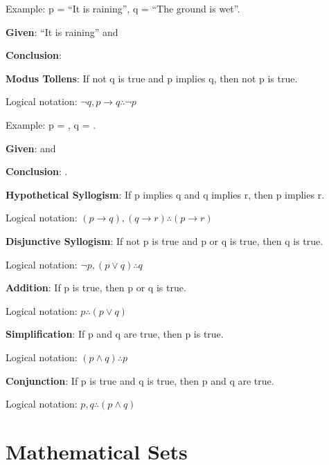 Example: p = ``It is raining'', q = ``The ground is wet''.

\textbf{Given}: ``It is raining'' and 

\textbf{Conclusion}: 

\vspace{4 mm}

\textbf{Modus Tollens}: If not q is true and p implies q, then not p is true.

Logical notation: \(\neg q, p \rightarrow q \therefore \neg p\)

Example: p = , q = .

\textbf{Given}:  and 

\textbf{Conclusion}: .

\vspace{10 mm}

\textbf{Hypothetical Syllogism}: If p implies q and q implies r, then p implies r.

Logical notation: \((p \rightarrow q), (q \rightarrow r) \therefore (p \rightarrow r)\)

\vspace{4 mm}

\textbf{Disjunctive Syllogism}: If not p is true and p or q is true, then q is true.

Logical notation: \(\neg p, (p \vee q) \therefore q\)

\vspace{10 mm}

\textbf{Addition}: If p is true, then p or q is true.

Logical notation: \(p \therefore (p \vee q)\)

\vspace{4 mm}

\textbf{Simplification}: If p and q are true, then p is true.

Logical notation: \((p \wedge q) \therefore p\)

\vspace{4 mm}

\textbf{Conjunction}: If p is true and q is true, then p and q are true.

Logical notation: \(p,q \therefore (p \wedge q)\)

\section{Mathematical Sets}

